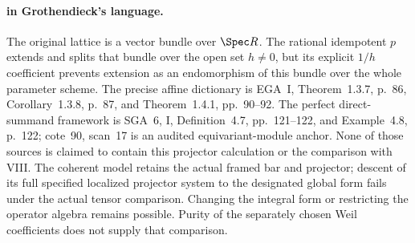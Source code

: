 \paragraph{ in Grothendieck's language.}
The original lattice is a vector bundle over $\Spec R$.
The rational idempotent $p$ extends and splits that bundle
over the open set $h\ne0$, but its explicit $1/h$ coefficient
prevents extension as an endomorphism of this bundle over
the whole parameter scheme. The precise affine dictionary is
EGA~I, Theorem~1.3.7, p.~86, Corollary~1.3.8, p.~87, and
Theorem~1.4.1, pp.~90--92.
The perfect direct-summand framework is SGA~6, I,
Definition~4.7, pp.~121--122, and Example~4.8, p.~122;
cote~90, scan~17 is an audited equivariant-module anchor.
None of those sources is claimed to contain this projector
calculation or the comparison with VIII.
The coherent model retains the actual framed bar and projector;
descent of its full specified localized projector system to
the designated global form fails under the actual tensor
comparison. Changing the integral form or restricting the
operator algebra remains possible. Purity of the separately
chosen Weil coefficients does not supply that comparison.
